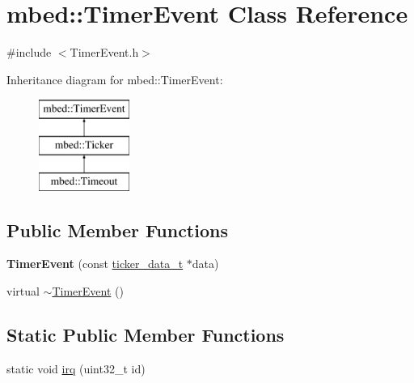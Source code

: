 \hypertarget{classmbed_1_1TimerEvent}{}\section{mbed\+:\+:Timer\+Event Class Reference}
\label{classmbed_1_1TimerEvent}


{\ttfamily \#include $<$Timer\+Event.\+h$>$}

Inheritance diagram for mbed\+:\+:Timer\+Event\+:\begin{figure}[H]
\begin{center}
\leavevmode
\includegraphics[height=3.000000cm]{classmbed_1_1TimerEvent}
\end{center}
\end{figure}
\subsection*{Public Member Functions}
\begin{DoxyCompactItemize}
\item 
{\bfseries Timer\+Event} (const \hyperlink{structticker__data__t}{ticker\+\_\+data\+\_\+t} $\ast$data)\hypertarget{classmbed_1_1TimerEvent_aa959f84529a056afa2308930ef309810}{}\label{classmbed_1_1TimerEvent_aa959f84529a056afa2308930ef309810}

\item 
virtual \hyperlink{classmbed_1_1TimerEvent_a6a2a3c2acee5b36ce21e40d84a4f9b71}{$\sim$\+Timer\+Event} ()
\end{DoxyCompactItemize}
\subsection*{Static Public Member Functions}
\begin{DoxyCompactItemize}
\item 
static void \hyperlink{classmbed_1_1TimerEvent_a5c57cce06f037a5682fdee29b8dd384e}{irq} (uint32\+\_\+t id)
\end{DoxyCompactItemize}
